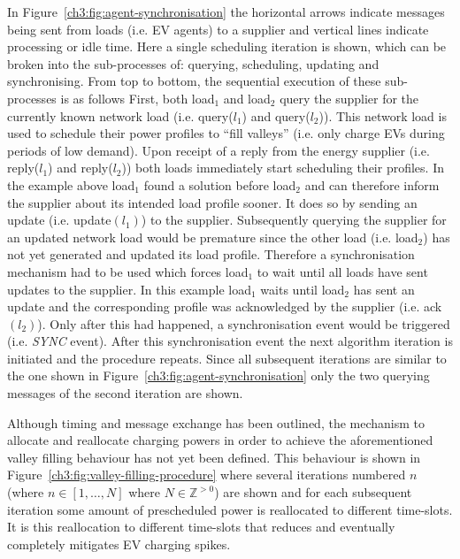 In Figure~\ref{ch3:fig:agent-synchronisation} the horizontal arrows indicate messages being sent from loads (i.e. EV agents) to a supplier and vertical lines indicate processing or idle time.
Here a single scheduling iteration is shown, which can be broken into the sub-processes of: querying, scheduling, updating and synchronising.
From top to bottom, the sequential execution of these sub-processes is as follows
First, both load$_1$ and load$_2$ query the supplier for the currently known network load (i.e. query($l_1$) and query($l_2$)).
This network load is used to schedule their power profiles to ``fill valleys'' (i.e. only charge EVs during periods of low demand).
Upon receipt of a reply from the energy supplier (i.e. reply($l_1$) and reply($l_2$)) both loads immediately start scheduling their profiles.
In the example above load$_1$ found a solution before load$_2$ and can therefore inform the supplier about its intended load profile sooner.
It does so by sending an update (i.e. update$(l_1)$) to the supplier.
Subsequently querying the supplier for an updated network load would be premature since the other load (i.e. load$_2$) has not yet generated and updated its load profile.
Therefore a synchronisation mechanism had to be used which forces load$_1$ to wait until all loads have sent updates to the supplier.
In this example load$_1$ waits until load$_2$ has sent an update and the corresponding profile was acknowledged by the supplier (i.e. ack$(l_2)$).
Only after this had happened, a synchronisation event would be triggered (i.e. \textit{SYNC} event).
After this synchronisation event the next algorithm iteration is initiated and the procedure repeats.
Since all subsequent iterations are similar to the one shown in Figure~\ref{ch3:fig:agent-synchronisation} only the two querying messages of the second iteration are shown.

Although timing and message exchange has been outlined, the mechanism to allocate and reallocate charging powers in order to achieve the aforementioned valley filling behaviour has not yet been defined.
This behaviour is shown in Figure~\ref{ch3:fig:valley-filling-procedure} where several iterations numbered $n$ (where $n \in [1, \dots, N]$ where $N \in \mathbb{Z}^{>0}$) are shown and for each subsequent iteration some amount of prescheduled power is reallocated to different time-slots.
It is this reallocation to different time-slots that reduces and eventually completely mitigates EV charging spikes.



